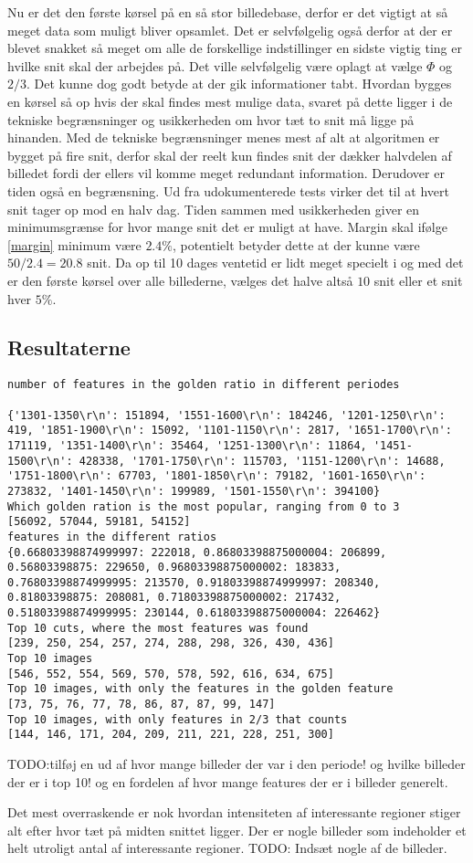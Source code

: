 {Nu er det den første kørsel på en så stor billedebase, derfor er det
vigtigt at så meget data som muligt bliver opsamlet. Det er selvfølgelig
også derfor at der er blevet snakket så meget om alle de forskellige
indstillinger en sidste vigtig ting er hvilke snit skal der arbejdes på.
Det ville selvfølgelig være oplagt at vælge $\Phi$ og $2/3$. Det kunne
dog godt betyde at der gik informationer tabt. Hvordan bygges en kørsel
så op hvis der skal findes mest mulige data, svaret på dette ligger i de
tekniske begrænsninger og usikkerheden om hvor tæt to snit må ligge på
hinanden.
Med de tekniske begrænsninger menes mest af alt at algoritmen er bygget
på fire snit, derfor skal der reelt kun findes snit der dækker halvdelen
af billedet fordi der ellers vil komme meget redundant information.
Derudover er tiden også en begrænsning. Ud fra udokumenterede tests
virker det til at hvert snit tager op mod en halv dag.
Tiden sammen med usikkerheden giver en minimumsgrænse for hvor mange
snit det er muligt at have. Margin skal ifølge \ref{margin} minimum være
$2.4\%$, potentielt betyder dette at der kunne være $50/2.4=20.8$ snit.
Da op til 10 dages ventetid er lidt meget specielt i og med det er den
første kørsel over alle billederne, vælges det halve altså $10$ snit
eller et snit hver $5\%$.
\subsection{Resultaterne}
\begin{verbatim}
number of features in the golden ratio in different periodes

{'1301-1350\r\n': 151894, '1551-1600\r\n': 184246, '1201-1250\r\n': 419, '1851-1900\r\n': 15092, '1101-1150\r\n': 2817, '1651-1700\r\n': 171119, '1351-1400\r\n': 35464, '1251-1300\r\n': 11864, '1451-1500\r\n': 428338, '1701-1750\r\n': 115703, '1151-1200\r\n': 14688, '1751-1800\r\n': 67703, '1801-1850\r\n': 79182, '1601-1650\r\n': 273832, '1401-1450\r\n': 199989, '1501-1550\r\n': 394100}
Which golden ration is the most popular, ranging from 0 to 3
[56092, 57044, 59181, 54152]
features in the different ratios
{0.66803398874999997: 222018, 0.86803398875000004: 206899, 0.56803398875: 229650, 0.96803398875000002: 183833, 0.76803398874999995: 213570, 0.91803398874999997: 208340, 0.81803398875: 208081, 0.71803398875000002: 217432, 0.51803398874999995: 230144, 0.61803398875000004: 226462}
Top 10 cuts, where the most features was found
[239, 250, 254, 257, 274, 288, 298, 326, 430, 436]
Top 10 images
[546, 552, 554, 569, 570, 578, 592, 616, 634, 675]
Top 10 images, with only the features in the golden feature
[73, 75, 76, 77, 78, 86, 87, 87, 99, 147]
Top 10 images, with only features in 2/3 that counts
[144, 146, 171, 204, 209, 211, 221, 228, 251, 300]
\end{verbatim}
TODO:tilføj en ud af hvor mange billeder der var i den periode!
	og hvilke billeder der er i top 10!
	og en fordelen af hvor mange features der er i billeder generelt.

Det mest overraskende er nok hvordan intensiteten af interessante
regioner stiger alt efter hvor tæt på midten snittet ligger.
Der er nogle billeder som indeholder et helt utroligt antal af
interessante regioner.
TODO: Indsæt nogle af de billeder.
}
